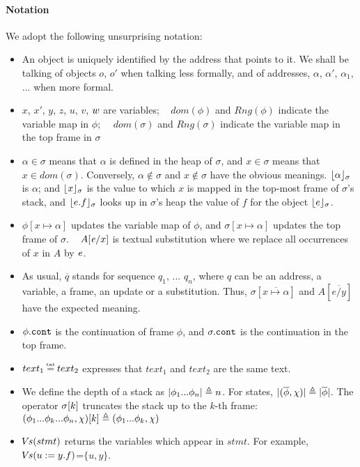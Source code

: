  
 
\paragraph{Notation} We adopt the following unsurprising notation:
\label{s:notation}
\begin{itemize}
\item
{An object is uniquely identified by the address that points to it. We shall be talking of objects $o$, $o'$ when talking less formally, and of addresses, $\alpha$, $\alpha'$, $\alpha_1$, ...  when more formal.}
\item
$x$, $x'$, $y$, $z$, $u$, $v$, $w$  are {variables}; \ 
$dom(\phi)$ and $Rng(\phi)$ indicate the variable map in $\phi$; \ \ $dom(\sigma)$ and $Rng(\sigma)$ indicate the variable map in the top frame in $\sigma$
\item
$\alpha \in \sigma$ means that $\alpha$ is defined in the heap of $\sigma$, and $x\in \sigma$ means that $x\in dom(\sigma)$.
Conversely,  $\alpha\notin\sigma$ and $x\notin\sigma$ %
 have the obvious meanings.
$\lfloor \alpha \rfloor_{\sigma}$  is $\alpha$; and $\lfloor x \rfloor_{\sigma}$  is the value to which  $x$  is mapped in the top-most frame of $\sigma$'s stack, 
and $\lfloor e.f \rfloor_{\sigma}$ looks up in $\sigma$'s heap the value of $f$ for the object  $\lfloor e \rfloor_{\sigma}$.
\item %
$\phi[x \mapsto \alpha]$ updates  the variable map  of $\phi$,  
and  $\sigma[x \mapsto \alpha]$ updates the top frame of $\sigma$. \
$A[\mathit{e}/x]$ is textual substitution where we replace all occurrences of $x$ in $A$ by $\mathit{e}$. 
\item
As usual, $\overline q$ stands for  sequence $q_1$, ... $q_n$, where $q$ can be an address, a variable,    a frame, an update or a substitution.
Thus,   $\sigma[\overline{x \mapsto \alpha}]$ and $A[ \overline{e/y}]$ 
have the expected meaning.
\item
$\phi.\mbox{\normalfont{\texttt{cont}}}$ is the continuation of frame $\phi$, and  $\sigma.\mbox{\normalfont{\texttt{cont}}}$ is the continuation in the top frame.
\item
$text_1 \txteq text_2$ expresses that $text_1$ and $text_2$ are  the same text.%
\item
We define the depth of a stack as $|\phi_1...\phi_n| \triangleq n$. For states, $|(\overline \phi, \chi)| \triangleq  |\overline \phi|$.
The  operator $\sigma[k]$ truncates the stack up to the $k$-th frame: %
 $(\phi_1...\phi_k...\phi_n,\chi)[k]  \triangleq   (\phi_1...\phi_k,\chi)$
\item
{ ${\hspace{-1pt}V\hspace{-1pt}}s(stmt)$ returns the variables which appear in $stmt$. For example, ${\hspace{-1pt}V\hspace{-1pt}}s(u:=y.f)$=$\{u,y\}$.}
\end{itemize}


